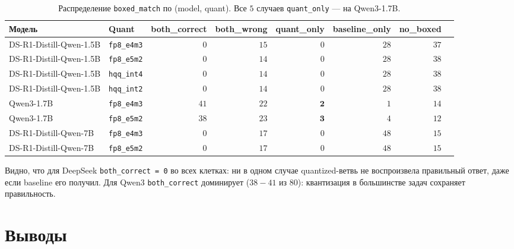 \documentclass[11pt, a4paper]{article}
\newcommand{\code}[1]{\texttt{#1}}
\begin{document}
\begin{table}[H]
\centering
\scriptsize
\setlength{\tabcolsep}{4pt}
\begin{tabular}{llrrrrrr}
\toprule
\textbf{Модель} & \textbf{Quant} & \textbf{both\_correct} & \textbf{both\_wrong} & \textbf{quant\_only} & \textbf{baseline\_only} & \textbf{no\_boxed} \\
\midrule
DS-R1-Distill-Qwen-1.5B & \code{fp8\_e4m3} & $0$  & $15$ & $0$         & $28$ & $37$ \\
DS-R1-Distill-Qwen-1.5B & \code{fp8\_e5m2} & $0$  & $14$ & $0$         & $28$ & $38$ \\
DS-R1-Distill-Qwen-1.5B & \code{hqq\_int4} & $0$  & $14$ & $0$         & $28$ & $38$ \\
DS-R1-Distill-Qwen-1.5B & \code{hqq\_int2} & $0$  & $14$ & $0$         & $28$ & $38$ \\
Qwen3-1.7B              & \code{fp8\_e4m3} & $41$ & $22$ & $\mathbf{2}$ & $1$  & $14$ \\
Qwen3-1.7B              & \code{fp8\_e5m2} & $38$ & $23$ & $\mathbf{3}$ & $4$  & $12$ \\
DS-R1-Distill-Qwen-7B   & \code{fp8\_e4m3} & $0$  & $17$ & $0$         & $48$ & $15$ \\
DS-R1-Distill-Qwen-7B   & \code{fp8\_e5m2} & $0$  & $17$ & $0$         & $48$ & $15$ \\
\bottomrule
\end{tabular}
\caption{Распределение \code{boxed\_match} по (model, quant). Все $5$
случаев \code{quant\_only} — на Qwen3-1.7B.}
\label{tab:fdp-rate}
\end{table}

Видно, что для DeepSeek \code{both\_correct = 0} во всех клетках: ни в
одном случае quantized-ветвь не воспроизвела правильный ответ, даже
если baseline его получил. Для Qwen3 \code{both\_correct} доминирует
($38{-}41$ из $80$): квантизация в большинстве задач сохраняет
правильность.

\section{Выводы}
\end{document}
